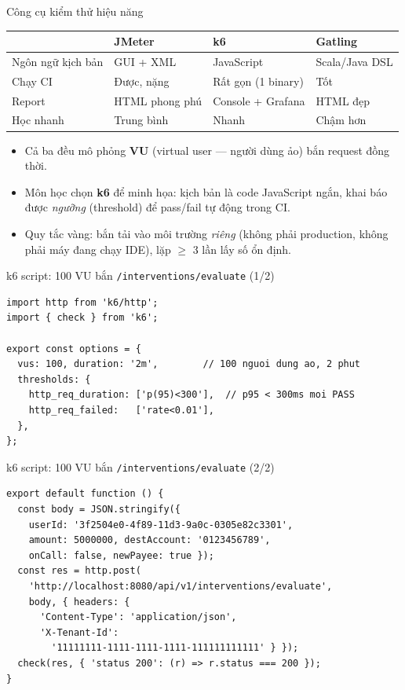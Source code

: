 \documentclass[aspectratio=169,12pt]{beamer}
\begin{document}
\begin{frame}{Công cụ kiểm thử hiệu năng}
  \small
  \begin{table}
    \begin{tabular}{@{}llll@{}}
      \toprule
       & \textbf{JMeter} & \textbf{k6} & \textbf{Gatling} \\
      \midrule
      Ngôn ngữ kịch bản & GUI + XML & JavaScript & Scala/Java DSL \\
      Chạy CI & Được, nặng & \alert{Rất gọn (1 binary)} & Tốt \\
      Report & HTML phong phú & Console + Grafana & HTML đẹp \\
      Học nhanh & Trung bình & Nhanh & Chậm hơn \\
      \bottomrule
    \end{tabular}
  \end{table}
  \begin{itemize}
    \item Cả ba đều mô phỏng \textbf{VU} (virtual user --- người dùng ảo) bắn request đồng thời.
    \item Môn học chọn \textbf{k6} để minh họa: kịch bản là code JavaScript ngắn, khai báo được \emph{ngưỡng} (threshold) để pass/fail tự động trong CI.
    \item Quy tắc vàng: bắn tải vào môi trường \emph{riêng} (không phải production, không phải máy đang chạy IDE), lặp $\geq$ 3 lần lấy số ổn định.
  \end{itemize}
\end{frame}

\begin{frame}[fragile]{k6 script: 100 VU bắn \texttt{/interventions/evaluate} (1/2)}
\begin{lstlisting}[basicstyle=\ttfamily\scriptsize]
import http from 'k6/http';
import { check } from 'k6';

export const options = {
  vus: 100, duration: '2m',        // 100 nguoi dung ao, 2 phut
  thresholds: {
    http_req_duration: ['p(95)<300'],  // p95 < 300ms moi PASS
    http_req_failed:   ['rate<0.01'],
  },
};
\end{lstlisting}
\end{frame}

\begin{frame}[fragile]{k6 script: 100 VU bắn \texttt{/interventions/evaluate} (2/2)}
\begin{lstlisting}[basicstyle=\ttfamily\scriptsize]
export default function () {
  const body = JSON.stringify({
    userId: '3f2504e0-4f89-11d3-9a0c-0305e82c3301',
    amount: 5000000, destAccount: '0123456789',
    onCall: false, newPayee: true });
  const res = http.post(
    'http://localhost:8080/api/v1/interventions/evaluate',
    body, { headers: {
      'Content-Type': 'application/json',
      'X-Tenant-Id':
        '11111111-1111-1111-1111-111111111111' } });
  check(res, { 'status 200': (r) => r.status === 200 });
}
\end{lstlisting}
\end{frame}
\end{document}
